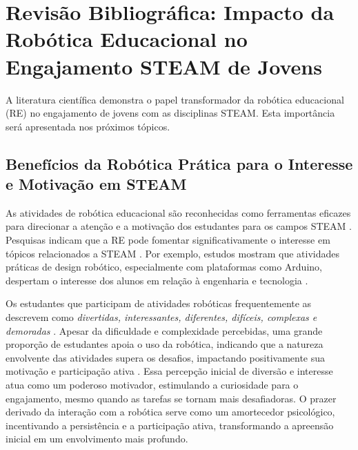 \documentclass[%
  a4paper,%
  12pt,%
  fleqn,%
  english,%
  brazilian,%
]{article}
\begin{document}


\section{Revisão Bibliográfica: Impacto da Robótica Educacional no Engajamento STEAM de Jovens}
A literatura científica demonstra o papel transformador da robótica educacional (RE) no engajamento de jovens com as disciplinas STEAM. Esta importância será apresentada nos próximos tópicos.

\subsection{Benefícios da Robótica Prática para o Interesse e Motivação em STEAM}
As atividades de robótica educacional são reconhecidas como ferramentas eficazes para direcionar a atenção e a motivação dos estudantes para os campos STEAM \cite{cheung2024SummerLibraries}. Pesquisas indicam que a RE pode fomentar significativamente o interesse em tópicos relacionados a STEAM \cite{ross2024BeyondExhibits}. Por exemplo, estudos mostram que atividades práticas de design robótico, especialmente com plataformas como Arduino, despertam o interesse dos alunos em relação à engenharia e tecnologia \cite{cheung2024SummerLibraries}.

Os estudantes que participam de atividades robóticas frequentemente as descrevem como \emph{divertidas, interessantes, diferentes, difíceis, complexas e demoradas} \cite{cheung2024SummerLibraries}. Apesar da dificuldade e complexidade percebidas, uma grande proporção de estudantes apoia o uso da robótica, indicando que a natureza envolvente das atividades supera os desafios, impactando positivamente sua motivação e participação ativa \cite{cheung2024SummerLibraries}. Essa percepção inicial de diversão e interesse atua como um poderoso motivador, estimulando a curiosidade para o engajamento, mesmo quando as tarefas se tornam mais desafiadoras. O prazer derivado da interação com a robótica serve como um amortecedor psicológico, incentivando a persistência e a participação ativa, transformando a apreensão inicial em um envolvimento mais profundo.
\end{document}
